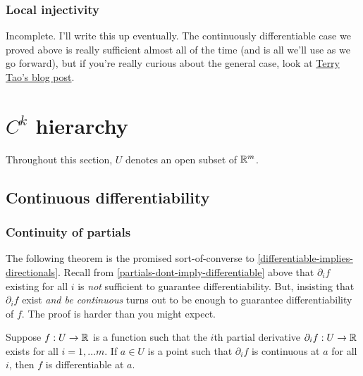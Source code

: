 \subsubsection*{Local injectivity}
	
{\color{blue} Incomplete. I'll write this up eventually. The continuously differentiable case we proved above is really sufficient almost all of the time (and is all we'll use as we go forward), but if you're really curious about the general case, look at \href{https://terrytao.wordpress.com/2011/09/12/the-inverse-function-theorem-for-everywhere-differentiable-maps/#more-5298}{Terry Tao's blog post}.}

\section{\texorpdfstring{$C^k$}{Ck} hierarchy}

Throughout this section, $U$ denotes an open subset of $\mathbb{R}^m$.

\subsection{Continuous differentiability}

\subsubsection*{Continuity of partials}

The following theorem is the promised sort-of-converse to \cref{differentiable-implies-directionals}. Recall from \cref{partials-dont-imply-differentiable} above that $\partial_i f$ existing for all $i$ is \emph{not} sufficient to guarantee differentiability. But, insisting that $\partial_i f$ exist \emph{and be continuous} turns out to be enough to guarantee differentiability of $f$. The proof is harder than you might expect. 

\begin{theorem} \label{continuous-partials}
	Suppose $f : U \to \mathbb{R}$ is a function such that the $i$th partial derivative $\partial_i f : U \to \mathbb{R}$ exists for all $i = 1 , \dotsc m$. If $a \in U$ is a point such that $\partial_i f$ is continuous at $a$ for all $i$, then $f$ is differentiable at $a$. 
\end{theorem}

